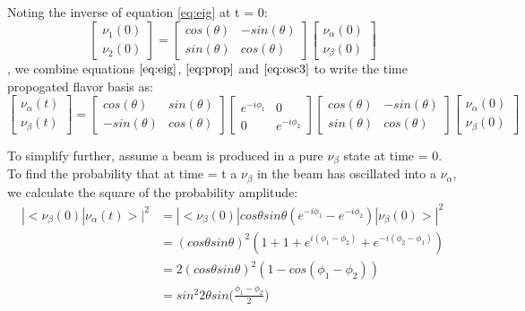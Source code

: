 \documentclass[12pt]{article}
\begin{document}
\noindent Noting the inverse of equation \ref{eq:eig} at t = 0:
\begin{equation} \label{eq:osc3}
 \begin{bmatrix}
 \nu_1(0)
 \\ \nu_2(0)
 \end{bmatrix}
 = \begin{bmatrix}
cos(\theta) & -sin(\theta)
\\ sin(\theta)& cos(\theta)
\end{bmatrix} 
 \begin{bmatrix}
 \nu_\alpha(0)
 \\ \nu_\beta(0)
 \end{bmatrix}
\end{equation},
we combine equations $\ref{eq:eig}$, $\ref{eq:prop}$ and $\ref{eq:osc3}$ to write the time propogated flavor basis as:
\begin{equation} \label{eq:osc4}
 \begin{bmatrix}
 \nu_\alpha(t)
 \\ \nu_\beta(t)
 \end{bmatrix}
 = \begin{bmatrix}
cos(\theta) & sin(\theta)
\\ -sin(\theta)& cos(\theta)
\end{bmatrix} 
  \begin{bmatrix}
 e^{-i\phi_1} & 0
\\ 0 & e^{-i\phi_2}
  \end{bmatrix}
\begin{bmatrix}
cos(\theta) & -sin(\theta)
\\ sin(\theta)& cos(\theta)
\end{bmatrix}
\begin{bmatrix}
\nu_\alpha(0)
\\ \nu_\beta(0) 
\end{bmatrix}
\end{equation}

\noindent To simplify further, assume a beam is produced in a pure $\nu_\beta$ state at time = 0. To find the probability that at time = t a $\nu_\beta$ in the beam has oscillated into a $\nu_\alpha$, we calculate the square of the probability amplitude:
\begin{equation} \label{eq:osc5}
\begin{split}
 |<\nu_\beta(0)|\nu_\alpha(t)>|^2 &= |<\nu_\beta(0)|cos\theta sin\theta(e^{-i\phi_1}-e^{-i\phi_2})|\nu_\beta(0)>|^2
\\&= (cos\theta sin\theta)^2(1+1+e^{i(\phi_1-\phi_2)} + e^{-i(\phi_2-\phi_1)})
\\&= 2(cos\theta sin\theta)^2(1-cos(\phi_1-\phi_2))
\\&= sin^2 2\theta sin\big(\frac{\phi_1-\phi_2}{2}\big)
\end{split}
 \end{equation}
\end{document}
